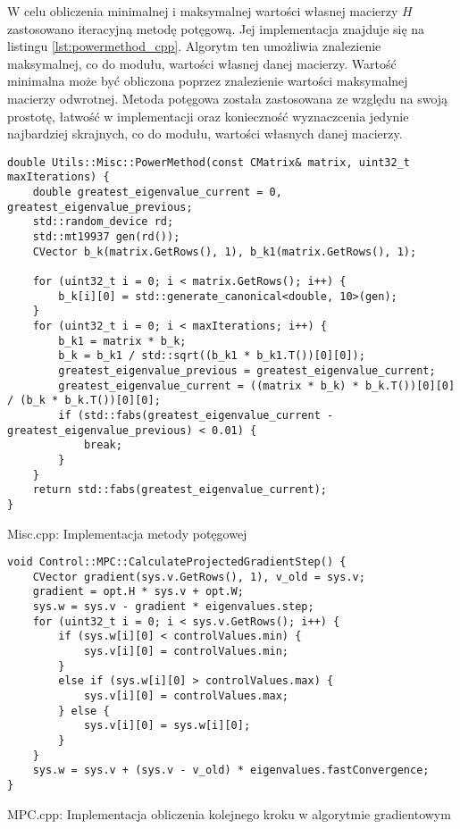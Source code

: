 W celu obliczenia minimalnej i maksymalnej wartości własnej macierzy $H$ zastosowano iteracyjną
metodę potęgową. Jej implementacja znajduje się na listingu \ref{lst:powermethod_cpp}. Algorytm
ten umożliwia znalezienie maksymalnej, co do modułu, wartości własnej danej macierzy. Wartość
minimalna może być obliczona poprzez znalezienie wartości maksymalnej macierzy odwrotnej. Metoda
potęgowa została zastosowana ze względu na swoją prostotę, łatwość w implementacji oraz konieczność
wyznaczcenia jedynie najbardziej skrajnych, co do modułu, wartości własnych danej macierzy. 
\begin{listing}[htb]
\begin{verbatim}
double Utils::Misc::PowerMethod(const CMatrix& matrix, uint32_t maxIterations) {
    double greatest_eigenvalue_current = 0, greatest_eigenvalue_previous;
    std::random_device rd;
    std::mt19937 gen(rd());
    CVector b_k(matrix.GetRows(), 1), b_k1(matrix.GetRows(), 1);

    for (uint32_t i = 0; i < matrix.GetRows(); i++) {
        b_k[i][0] = std::generate_canonical<double, 10>(gen);
    }
    for (uint32_t i = 0; i < maxIterations; i++) {
        b_k1 = matrix * b_k;
        b_k = b_k1 / std::sqrt((b_k1 * b_k1.T())[0][0]);
        greatest_eigenvalue_previous = greatest_eigenvalue_current;
        greatest_eigenvalue_current = ((matrix * b_k) * b_k.T())[0][0] / (b_k * b_k.T())[0][0];
        if (std::fabs(greatest_eigenvalue_current - greatest_eigenvalue_previous) < 0.01) {
            break;
        }
    }
    return std::fabs(greatest_eigenvalue_current);
}
\end{verbatim}
\caption{Misc.cpp: Implementacja metody potęgowej}
\label{lst:powermethod_cpp}
\end{listing}



\begin{listing}[htb]
\begin{verbatim}
void Control::MPC::CalculateProjectedGradientStep() {
    CVector gradient(sys.v.GetRows(), 1), v_old = sys.v;
    gradient = opt.H * sys.v + opt.W;
    sys.w = sys.v - gradient * eigenvalues.step;
    for (uint32_t i = 0; i < sys.v.GetRows(); i++) {
        if (sys.w[i][0] < controlValues.min) {
            sys.v[i][0] = controlValues.min;
        }
        else if (sys.w[i][0] > controlValues.max) {
            sys.v[i][0] = controlValues.max;
        } else {
            sys.v[i][0] = sys.w[i][0];
        }
    }
    sys.w = sys.v + (sys.v - v_old) * eigenvalues.fastConvergence;
}
\end{verbatim}
\caption{MPC.cpp: Implementacja obliczenia kolejnego kroku w algorytmie gradientowym}
\label{lst:step_cpp}
\end{listing}

